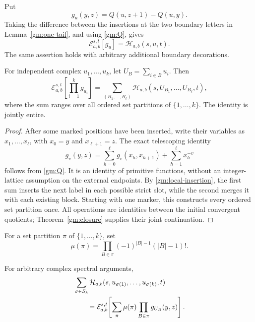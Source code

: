 Put
\begin{equation}\label{gm:gap}
 g_u(y,z)=Q(u,z+1)-Q(u,y).
\end{equation}
Taking the difference between the insertions at the two boundary
letters in Lemma~\ref{gm:one-tail}, and using \eqref{gm:Q}, gives
\begin{equation}\label{gm:local-insertion}
 \mathcal E_{a,b}^{s,t}[g_u]=\mathcal H_{a,b}(s,u,t).
\end{equation}
The same assertion holds with arbitrary additional boundary
decorations.

\begin{lemma}
\label{gm:ordered-partitions}
For independent complex \(u_1,\ldots,u_k\), let
\(U_B=\sum_{i\in B}u_i\).  Then
\begin{equation}\label{gm:ordered-partition-formula}
 \mathcal E_{a,b}^{s,t}\!\left[\prod_{i=1}^kg_{u_i}\right]
 =\sum_{(B_1,\ldots,B_\ell)}
      \mathcal H_{a,b}(s,U_{B_1},\ldots,U_{B_\ell},t),
\end{equation}
where the sum ranges over all ordered set partitions of
\(\{1,\ldots,k\}\).  The identity is jointly entire.
\end{lemma}

\begin{proof}
After some marked positions have been inserted, write their variables
as \(x_1,\ldots,x_\ell\), with \(x_0=y\) and
\(x_{\ell+1}=z\).  The exact telescoping identity
\begin{equation}\label{gm:split}
 g_v(y,z)=\sum_{h=0}^\ell g_v(x_h,x_{h+1})
                              +\sum_{h=1}^\ell x_h^{-v}
\end{equation}
follows from \eqref{gm:Q}.  It is an identity of primitive functions,
without an integer-lattice assumption on the external endpoints.
By \eqref{gm:local-insertion}, the first sum inserts the next label
in each possible strict slot, while the second merges it with each
existing block.  Starting with one marker, this constructs every
ordered set partition once.  All operations are identities between the
initial convergent quotients; Theorem~\ref{gm:closure} supplies their
joint continuation.
\end{proof}

For a set partition \(\pi\) of \(\{1,\ldots,k\}\), set
\[
 \mu(\pi)=\prod_{B\in\pi}(-1)^{|B|-1}(|B|-1)!.
\]

\begin{theorem}
\label{gm:symmetric}
For arbitrary complex spectral arguments,
\begin{align}\label{gm:symmetric-formula}
 &\sum_{\sigma\in S_k}
       \mathcal H_{a,b}(s,u_{\sigma(1)},\ldots,u_{\sigma(k)},t)
 \notag\\
 &\qquad=\mathcal E_{a,b}^{s,t}\!\left[
        \sum_{\pi}\mu(\pi)\prod_{B\in\pi}g_{U_B}(y,z)\right].
\end{align}
\end{theorem}

